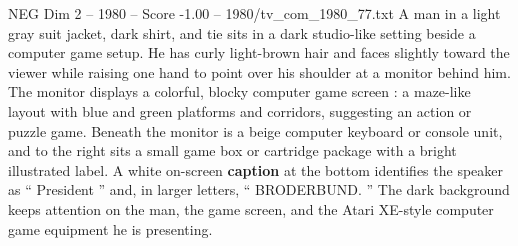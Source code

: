 \begin{textsample}{NEG Dim 2 – 1980 – Score -1.00 – 1980/tv\_com\_1980\_77.txt}  \label{ex:f2_neg_035}
A man in a light gray suit jacket, dark shirt, and tie sits in a dark studio-like setting beside a computer game setup.
He has curly light-brown hair and faces slightly toward the viewer while raising one hand to point over his shoulder at a monitor behind him.
The monitor displays a colorful, blocky computer game screen : a maze-like layout with blue and green platforms and corridors, suggesting an action or puzzle game.
Beneath the monitor is a beige computer keyboard or console unit, and to the right sits a small game box or cartridge package with a bright illustrated label.
A white on-screen \textbf{caption} at the bottom identifies the speaker as “ President ” and, in larger letters, “ BRODERBUND. ” The dark background keeps attention on the man, the game screen, and the Atari XE-style computer game equipment he is presenting.

\end{textsample}
